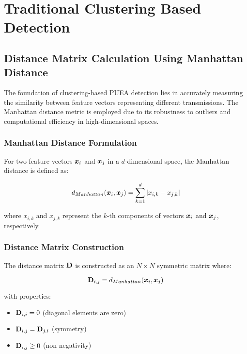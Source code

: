 
\chapter{Traditional Clustering Based Detection}

\section{Distance Matrix Calculation Using Manhattan Distance}
The foundation of clustering-based PUEA detection lies in accurately measuring the similarity between feature vectors representing different transmissions. The Manhattan distance metric is employed due to its robustness to outliers and computational efficiency in high-dimensional spaces.

\subsection{Manhattan Distance Formulation}
For two feature vectors $\boldsymbol{x}_i$ and $\boldsymbol{x}_j$ in a $d$-dimensional space, the Manhattan distance is defined as:

\begin{equation}
d_{Manhattan}(\boldsymbol{x}_i, \boldsymbol{x}_j) = \sum_{k=1}^{d} |x_{i,k} - x_{j,k}|
\end{equation}

where $x_{i,k}$ and $x_{j,k}$ represent the $k$-th components of vectors $\boldsymbol{x}_i$ and $\boldsymbol{x}_j$, respectively.

\subsection{Distance Matrix Construction}
The distance matrix $\mathbf{D}$ is constructed as an $N \times N$ symmetric matrix where:

\begin{equation}
\mathbf{D}_{i,j} = d_{Manhattan}(\boldsymbol{x}_i, \boldsymbol{x}_j)
\end{equation}

with properties:
\begin{itemize}
\item $\mathbf{D}_{i,i} = 0$ (diagonal elements are zero)
\item $\mathbf{D}_{i,j} = \mathbf{D}_{j,i}$ (symmetry)
\item $\mathbf{D}_{i,j} \geq 0$ (non-negativity)
\end{itemize}

